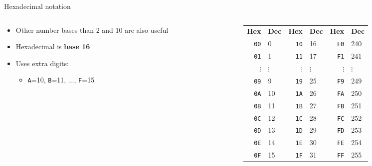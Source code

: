 \begin{frame}{Hexadecimal notation}
	\begin{columns}
		\begin{column}{0.32\textwidth}
			\begin{itemize}
				\pause\item Other number bases than 2 and 10 are also useful
				\pause\item Hexadecimal is \textbf{base 16}
				\pause\item Uses extra digits:
					\begin{itemize}
						\item \texttt{A}=10, \texttt{B}=11, ..., \texttt{F}=15
					\end{itemize}
			\end{itemize}
		\end{column}
		\pause
		\begin{column}{0.64\textwidth}
			\begin{tabular}{rl|rl|rl}
				\textbf{Hex} & \textbf{Dec} & \textbf{Hex} & \textbf{Dec} & \textbf{Hex} & \textbf{Dec} \\
				\texttt{00} & 0             & \texttt{10} & 16            & \texttt{F0} & 240           \\
				\texttt{01} & 1             & \texttt{11} & 17            & \texttt{F1} & 241           \\
				$\vdots$ & $\vdots$         & $\vdots$ & $\vdots$         & $\vdots$ & $\vdots$         \\
				\texttt{09} & 9             & \texttt{19} & 25            & \texttt{F9} & 249           \\
				\texttt{0A} & 10            & \texttt{1A} & 26            & \texttt{FA} & 250           \\
				\texttt{0B} & 11            & \texttt{1B} & 27            & \texttt{FB} & 251           \\
				\texttt{0C} & 12            & \texttt{1C} & 28            & \texttt{FC} & 252           \\
				\texttt{0D} & 13            & \texttt{1D} & 29            & \texttt{FD} & 253           \\
				\texttt{0E} & 14            & \texttt{1E} & 30            & \texttt{FE} & 254           \\
				\texttt{0F} & 15            & \texttt{1F} & 31            & \texttt{FF} & 255           
			\end{tabular}
		\end{column}
	\end{columns}
\end{frame}
